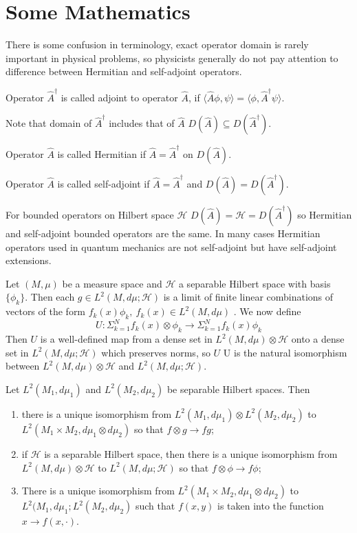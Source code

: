 \section{Some Mathematics}
\label{cq:math}
 There is some confusion in terminology, exact  operator domain is 
 rarely important in physical problems, so physicists generally do 
 not pay attention to difference between Hermitian and self-adjoint operators.
\begin{definition}
    Operator $ \hat A^\dag$ is called adjoint to operator $ \hat A $,
    if 
$ \langle \hat A\phi,\psi \rangle = \langle \phi,\hat A^\dag \psi \rangle$.
\end{definition}
Note that domain of $ \hat A^\dag$ includes that of $ \hat A $
$ D( \hat A)\subseteq D( \hat A^\dag)$.
\begin{definition}
    Operator $ \hat A $ is called Hermitian if $ \hat A = \hat A^\dag $ on
    $D( \hat A)$.
\end{definition}
\begin{definition}
    Operator $ \hat A $ is called  self-adjoint if $ \hat A = \hat A^\dag $
    and $D( \hat A) = D( \hat A^\dag)$.
\end{definition}
For bounded operators on Hilbert space $ \mathcal{H} $ 
$D( \hat A) = \mathcal{H} = D( \hat A^\dag)$ so Hermitian
and self-adjoint bounded operators are the same. 
In many cases Hermitian operators used in quantum mechanics 
are not self-adjoint but have self-adjoint extensions.

Let $ (M,\mu) $ be a 
measure space and $ \mathcal{H} $ a separable Hilbert space with basis $ \{\phi_k\} $. 
Then each $ g \in L^2(M,d \mu;\mathcal{H}) $
is a limit of finite linear combinations of 
vectors of the form $ f_k(x) \phi_k,\ f_k(x) \in L^2(M,d \mu) $ .
We now define 
\[ 
U: \Sigma_{k=1}^N f_k(x)\otimes \phi_k \to
\Sigma_{k=1}^N f_k(x) \phi_k
\]
Then $ U $ is a well-defined map from a dense set in $ L^2(M,d \mu) \otimes \mathcal{H} $
onto a dense set in $ L^2(M,d \mu;\mathcal{H}) $
which preserves norms, so $ U $ U is  
the natural isomorphism between 
$ L^2(M,d \mu) \otimes \mathcal{H} $ and
$ L^2(M,d \mu;\mathcal{H}) $.

\begin{theorem}
    \label{cq:math-t}
    Let $ L^2(M_1,d \mu_1)$ and $ L^2(M_2,d \mu_2)$
 be  separable Hilbert spaces. Then
    \begin{enumerate}
       \item there is a unique isomorphism from
$ L^2(M_1,d \mu_1) \otimes  L^2(M_2,d \mu_2)$ to
$ L^2(M_1\times M_2,d \mu_1\otimes d \mu_2)$
so that $ f\otimes g \to f g $;
\item
 if $ \mathcal{H} $ is a separable Hilbert space, then there is a unique isomorphism from
$ L^2(M,d \mu) \otimes \mathcal{H} $ to
$ L^2(M,d \mu;\mathcal{H}) $
so that $ f\otimes \phi \to f \phi $;
\item
 There is a unique isomorphism from
$ L^2(M_1\times M_2,d \mu_1\otimes d \mu_2)$ to
$ L^2(M_1,d \mu_1;L^2(M_2,d \mu_2)$ 
such that $f(x, y)$ is taken into the function 
$ x \to f(x,\cdot) $. 
    \end{enumerate}
\end{theorem}

